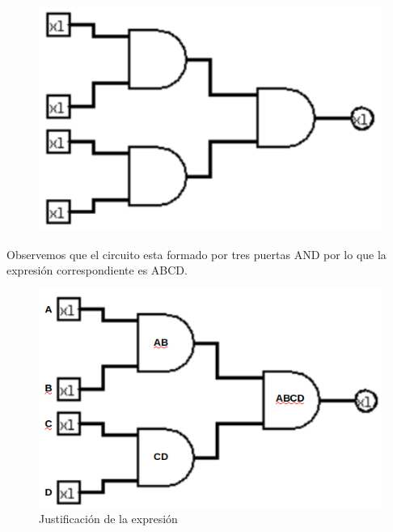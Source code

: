 \documentclass[11pt,letterpaper]{article}
\begin{document}
\begin{itemize}
		\begin{figure}[h]
			\centering
			\includegraphics[scale=0.30]{Pregunta4.png}			
		\end{figure}
	
	Observemos que el circuito esta formado por tres puertas AND por lo que la expresión correspondiente es ABCD.
	
	\begin{figure}[h]
		\centering
		\includegraphics[scale=0.35]{CircExpr.png}
		\caption{Justificación de la expresión}
	\end{figure}
		
	\end{itemize}		
\end{document}
